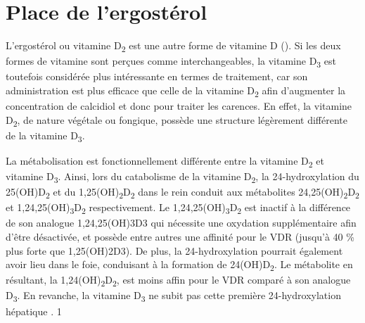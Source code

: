 \documentclass[
  a4paper,
  DIV=11,
  numbers=noendperiod,
  listof=totoc]{scrreprt}
\begin{document}
\section{Place de l'ergostérol}\label{place-de-lergostuxe9rol}

L'ergostérol ou vitamine D\textsubscript{2} est une autre forme de
vitamine D (). Si les deux formes de vitamine sont
perçues comme interchangeables, la vitamine D\textsubscript{3} est
toutefois considérée plus intéressante en termes de traitement, car son
administration est plus efficace que celle de la vitamine
D\textsubscript{2} afin d'augmenter la concentration de calcidiol et
donc pour traiter les carences. En effet, la vitamine
D\textsubscript{2}, de nature végétale ou fongique, possède une
structure légèrement différente de la vitamine D\textsubscript{3}.

La métabolisation est fonctionnellement différente entre la vitamine
D\textsubscript{2} et vitamine D\textsubscript{3}. Ainsi, lors du
catabolisme de la vitamine D\textsubscript{2}, la 24-hydroxylation du
25(OH)D\textsubscript{2} et du
1,25(OH)\textsubscript{2}D\textsubscript{2} dans le rein conduit aux
métabolites 24,25(OH)\textsubscript{2}D\textsubscript{2} et
1,24,25(OH)\textsubscript{3}D\textsubscript{2} respectivement. Le
1,24,25(OH)\textsubscript{3}D\textsubscript{2} est inactif à la
différence de son analogue \ac{1,24,25(OH)3D3} qui nécessite une
oxydation supplémentaire afin d'être désactivée, et possède entre autres
une affinité pour le \ac{VDR} (jusqu'à 40 \% plus forte que
\ac{1,25(OH)2D3}). De plus, la 24-hydroxylation pourrait également avoir
lieu dans le foie, conduisant à la formation de
24(OH)D\textsubscript{2}. Le métabolite en résultant, la
1,24(OH)\textsubscript{2}D\textsubscript{2}, est moins affin pour le
\ac{VDR} comparé à son analogue D\textsubscript{3}. En revanche, la
vitamine D\textsubscript{3} ne subit pas cette première 24-hydroxylation
hépatique \autocite{Houghton.2006}. 1
\end{document}
